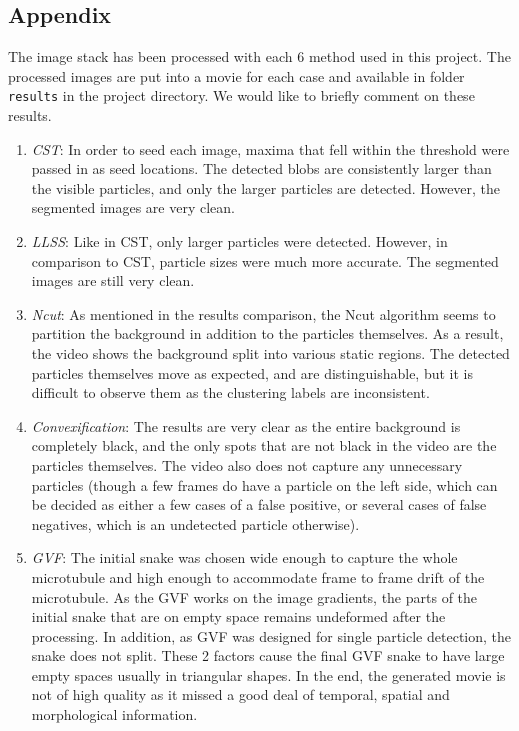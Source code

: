 \documentclass{article}
\begin{document}
\clearpage
\subsection*{Appendix}

The image stack has been processed with each 6 method used in this project. The processed images are put into a movie for each case and available in folder \texttt{results} in the project directory. We would like to briefly comment on these results.

\begin{enumerate}
\item \emph{CST}: In order to seed each image, maxima that fell within the threshold were passed in as seed locations. The detected blobs are consistently larger than the visible particles, and only the larger particles are detected. However, the segmented images are very clean.

\item \emph{LLSS}: Like in CST, only larger particles were detected. However, in comparison to CST, particle sizes were much more accurate. The segmented images are still very clean.

\item \emph{Ncut}: As mentioned in the results comparison, the Ncut algorithm seems to partition the background in addition to the particles themselves. As a result, the video shows the background split into various static regions. The detected particles themselves move as expected, and are distinguishable, but it is difficult to observe them as the clustering labels are inconsistent.

\item \emph{Convexification}: The results are very clear as the entire background is completely black, and the only spots that are not black in the video are the particles themselves. The video also does not capture any unnecessary particles (though a few frames do have a particle on the left side, which can be decided as either a few cases of a false positive, or several cases of false negatives, which is an undetected particle otherwise).

\item \emph{GVF}: The initial snake was chosen wide enough to capture the whole microtubule and high enough to accommodate frame to frame drift of the microtubule. As the GVF works on the image gradients, the parts of the initial snake that are on empty space remains undeformed after the processing. In addition, as GVF was designed for single particle detection, the snake does not split. These 2 factors cause the final GVF snake to have large empty spaces usually in triangular shapes. In the end, the generated movie is not of high quality as it missed a good deal of temporal, spatial and morphological information.


\end{enumerate}
\end{document}
